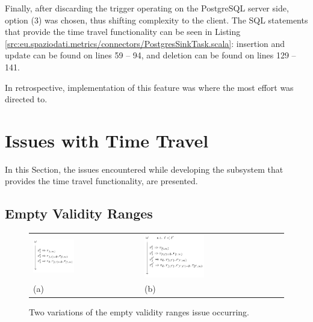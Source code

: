 Finally, after discarding the trigger operating on the PostgreSQL server side, option (3) was chosen, thus shifting complexity to the client.
The SQL statements that provide the time travel functionality can be seen in Listing \ref{src:eu.spaziodati.metrics/connectors/PostgresSinkTask.scala}: insertion and update can be found on lines 59 -- 94, and deletion can be found on lines 129 -- 141.

In retrospective, implementation of this feature was where the most effort was directed to.


\section{Issues with Time Travel}

In this Section, the issues encountered while developing the subsystem that provides the time travel functionality, are presented.


\subsection{Empty Validity Ranges}

\begin{figure}
	\centering
	\begin{tabular}{p{} p{}}
		\vspace{0pt} \includegraphics[width=0.4\textwidth]{figures/time-travel/empty-ranges} &
		\vspace{0pt} \includegraphics[width=0.44\textwidth]{figures/time-travel/empty-ranges-2} \\
		(a) & (b)
	\end{tabular}
	\caption{Two variations of the empty validity ranges issue occurring.}
	\label{fig:empty-ranges}
\end{figure}

